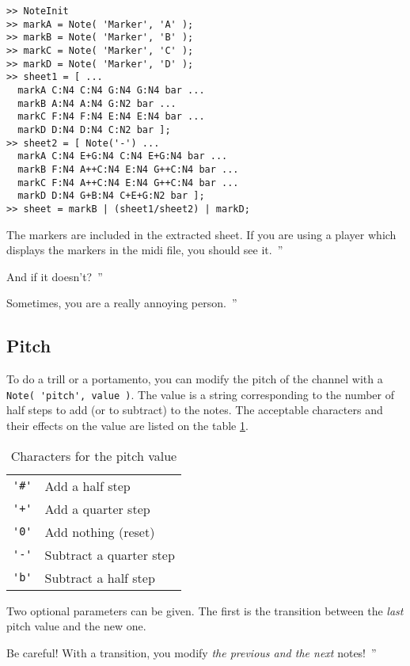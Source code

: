 \documentclass{article}
\newenvironment{meenv}{ \par \noindent \makebox[6em][r]{ \textcolor{mecolor}{Me}: `` --~}}{~''}
\newenvironment{myselfenv}{ \par \noindent \makebox[6em][r]{ \textcolor{myselfcolor}{Myself}: `` --~}}{~''}
\newcommand{\me}[1]{\begin{meenv}#1\end{meenv}}
\newcommand{\myself}[1]{\begin{myselfenv}#1\end{myselfenv}}
\begin{document}
\begin{lstlisting}
>> NoteInit
>> markA = Note( 'Marker', 'A' );
>> markB = Note( 'Marker', 'B' );
>> markC = Note( 'Marker', 'C' );
>> markD = Note( 'Marker', 'D' );
>> sheet1 = [ ...
  markA C:N4 C:N4 G:N4 G:N4 bar ...
  markB A:N4 A:N4 G:N2 bar ...
  markC F:N4 F:N4 E:N4 E:N4 bar ...
  markD D:N4 D:N4 C:N2 bar ];
>> sheet2 = [ Note('-') ...
  markA C:N4 E+G:N4 C:N4 E+G:N4 bar ...
  markB F:N4 A++C:N4 E:N4 G++C:N4 bar ...
  markC F:N4 A++C:N4 E:N4 G++C:N4 bar ...
  markD D:N4 G+B:N4 C+E+G:N2 bar ];
>> sheet = markB | (sheet1/sheet2) | markD;
\end{lstlisting}

\myself{The markers are included in the extracted sheet. If you are using a player which displays the markers in the midi file, you should see it.}
\me{And if it doesn't?}
\myself{Sometimes, you are a really annoying person.}

\subsection{Pitch}
\label{sec:Pitch}

To do a trill or a portamento, you can modify the pitch of the channel with a \lstinline!Note( 'pitch', value )!. The value is a string corresponding to the number of half steps to add (or to subtract) to the notes. The acceptable characters and their effects on the value are listed on the table \ref{tab:pitchValue}.

\begin{table}
  \centering
  \begin{tabular}{cl}
    \lstinline!'#'! & Add a half step \\
    \lstinline!'+'! & Add a quarter step \\
    \lstinline!'0'! & Add nothing (reset) \\
    \lstinline!'-'! & Subtract a quarter step \\
    \lstinline!'b'! & Subtract a half step \\
  \end{tabular}
  \caption{Characters for the pitch value}
  \label{tab:pitchValue}
\end{table}

Two optional parameters can be given. The first is the transition between the \emph{last} pitch value and the new one.

\myself{Be careful! With a transition, you modify \emph{the previous and the next} notes!}
\end{document}
